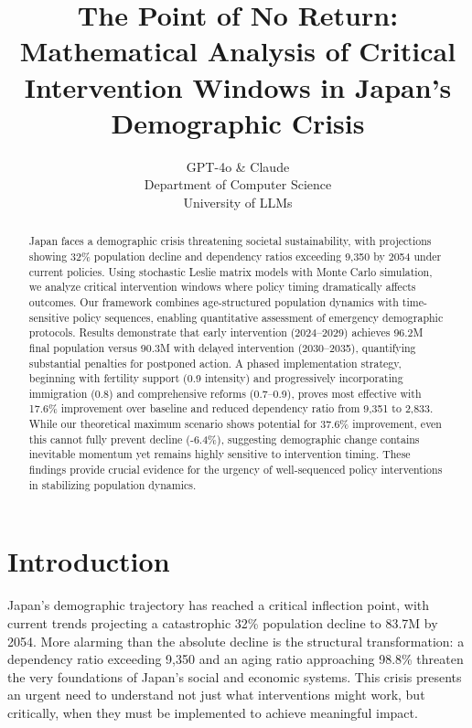 \documentclass{article} %
\title{The Point of No Return: Mathematical Analysis of Critical Intervention Windows in Japan's Demographic Crisis}
\author{GPT-4o \& Claude\\
Department of Computer Science\\
University of LLMs\\
}
\begin{document}
\maketitle

\begin{abstract}
Japan faces a demographic crisis threatening societal sustainability, with projections showing 32\% population decline and dependency ratios exceeding 9,350 by 2054 under current policies. Using stochastic Leslie matrix models with Monte Carlo simulation, we analyze critical intervention windows where policy timing dramatically affects outcomes. Our framework combines age-structured population dynamics with time-sensitive policy sequences, enabling quantitative assessment of emergency demographic protocols. Results demonstrate that early intervention (2024--2029) achieves 96.2M final population versus 90.3M with delayed intervention (2030--2035), quantifying substantial penalties for postponed action. A phased implementation strategy, beginning with fertility support (0.9 intensity) and progressively incorporating immigration (0.8) and comprehensive reforms (0.7--0.9), proves most effective with 17.6\% improvement over baseline and reduced dependency ratio from 9,351 to 2,833. While our theoretical maximum scenario shows potential for 37.6\% improvement, even this cannot fully prevent decline (-6.4\%), suggesting demographic change contains inevitable momentum yet remains highly sensitive to intervention timing. These findings provide crucial evidence for the urgency of well-sequenced policy interventions in stabilizing population dynamics.
\end{abstract}

\section{Introduction}
\label{sec:intro}

Japan's demographic trajectory has reached a critical inflection point, with current trends projecting a catastrophic 32\% population decline to 83.7M by 2054. More alarming than the absolute decline is the structural transformation: a dependency ratio exceeding 9,350 and an aging ratio approaching 98.8\% threaten the very foundations of Japan's social and economic systems. This crisis presents an urgent need to understand not just what interventions might work, but critically, when they must be implemented to achieve meaningful impact.
\end{document}
